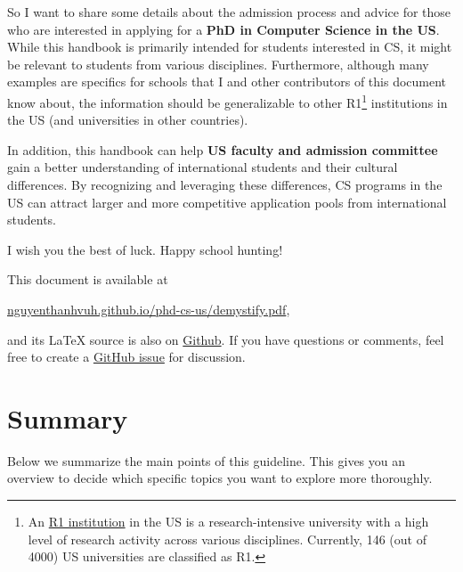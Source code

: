 \documentclass[oneside,11pt,dvipsnames]{book}
\begin{document}
So I want to share some details about the admission process and advice for those who are interested in applying for a \textbf{PhD in Computer Science in the US}.
While this handbook is primarily intended for students interested in CS, it might be relevant to students from various disciplines.
Furthermore, although many examples are specifics for schools that I and other contributors of this document know about, the information should be generalizable to other R1\footnote{An \href{https://en.wikipedia.org/wiki/List_of_research_universities_in_the_United_States}{R1 institution} in the US is a research-intensive university with a high level of research activity across various disciplines. Currently, 146 (out of 4000) US universities are classified as R1.} institutions in the US (and universities in other countries).

In addition, this handbook can help \textbf{US faculty and admission committee} gain a better understanding of international students and their cultural differences.  By recognizing and leveraging these differences, CS programs in the US can attract larger and more competitive application pools from international students.

I wish you the best of luck. Happy school hunting!

\begin{mybox}
This document is available at

\begin{center}
  \href{https://nguyenthanhvuh.github.io/phd-cs-us/demystify.pdf}{nguyenthanhvuh.github.io/phd-cs-us/demystify.pdf},
\end{center}

\noindent and its \LaTeX{} source is also on \href{https://github.com/nguyenthanhvuh/phd-cs-us}{Github}. If you have questions or comments, feel free to create a \href{https://github.com/nguyenthanhvuh/phd-cs-us/issues}{GitHub issue} for discussion.

\end{mybox}

\newpage
\tableofcontents

\chapter{Summary}\label{sec:summary}

Below we summarize the main points of this guideline. This gives you an overview to decide which specific topics you want to explore more thoroughly.
\end{document}
